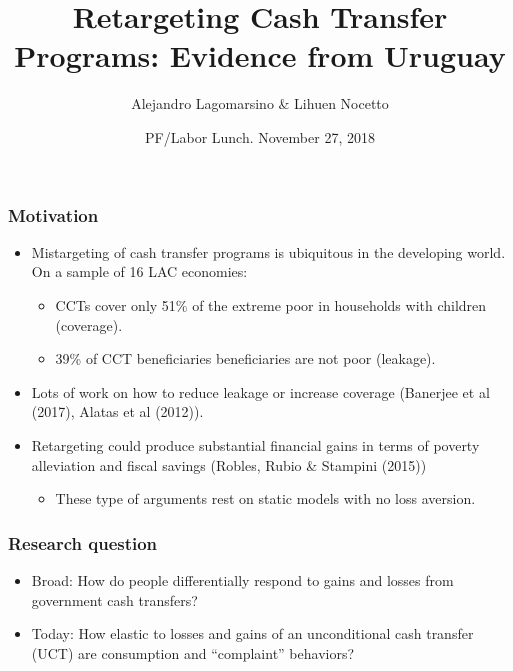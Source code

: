 \documentclass{beamer}
\title[Retargeting Cash Transfer Programs] %
{Retargeting Cash Transfer Programs: Evidence from Uruguay}
\author[Alejandro Lagomarsino] %
{Alejandro Lagomarsino \& Lihuen Nocetto\inst{*} }
\institute[] %
{
	\inst{*}%
	Harvard University\\
	Pontifical Catholic University of Chile
}
\date[PF/Labor Lunch - November 2018] %
{PF/Labor Lunch. November 27, 2018}
\begin{document}
	\setlength{\parindent}{10pt}
	
	\frame{\titlepage}

\begin{frame}
\frametitle{Motivation}
\begin{itemize}
	\item Mistargeting of cash transfer programs is ubiquitous in the developing world. On a sample of 16 LAC economies:
	\begin{itemize}
		\item CCTs cover only 51\% of the extreme poor in households with children (coverage).
		\item 39\% of CCT beneficiaries beneficiaries are not poor (leakage).

	\end{itemize}
	\item Lots of work on how to reduce leakage or increase coverage (Banerjee et al (2017), Alatas et al (2012)). 
	\item Retargeting could produce substantial financial gains in terms of poverty alleviation and fiscal savings (Robles, Rubio \& Stampini (2015))
	\begin{itemize}
		\item These type of arguments rest on static models with no loss aversion.
	\end{itemize}
\end{itemize}
\end{frame}

\begin{frame}
\frametitle{Research question}
\begin{itemize}
	\item Broad: How do people differentially respond to gains and losses from government cash transfers?
	\item Today: How elastic to losses and gains of an unconditional cash transfer (UCT) are consumption and ``complaint'' behaviors?
\end{itemize}
\end{frame}
\end{document}
